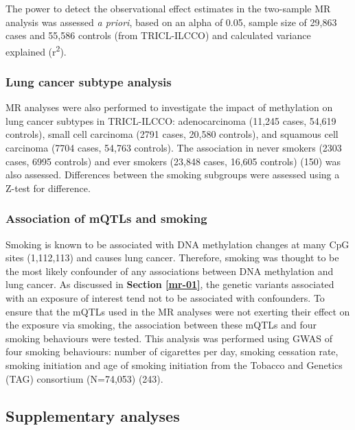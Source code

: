 \documentclass[11pt,twoside]{bristolthesis}
\begin{document}
The power to detect the observational effect estimates in the two-sample MR analysis was assessed \emph{a priori}, based on an alpha of 0.05, sample size of 29,863 cases and 55,586 controls (from TRICL-ILCCO) and calculated variance explained (r\textsuperscript{2}).

\hypertarget{lc-subtypes-methods}{%
\subsubsection{Lung cancer subtype analysis}\label{lc-subtypes-methods}}

MR analyses were also performed to investigate the impact of methylation on lung cancer subtypes in TRICL-ILCCO: adenocarcinoma (11,245 cases, 54,619 controls), small cell carcinoma (2791 cases, 20,580 controls), and squamous cell carcinoma (7704 cases, 54,763 controls). The association in never smokers (2303 cases, 6995 controls) and ever smokers (23,848 cases, 16,605 controls) (150) was also assessed. Differences between the smoking subgroups were assessed using a Z-test for difference.

\hypertarget{mqtl-smoking-mr-methods}{%
\subsubsection{Association of mQTLs and smoking}\label{mqtl-smoking-mr-methods}}

Smoking is known to be associated with DNA methylation changes at many CpG sites (1,112,113) and causes lung cancer. Therefore, smoking was thought to be the most likely confounder of any associations between DNA methylation and lung cancer. As discussed in \textbf{Section \ref{mr-01}}, the genetic variants associated with an exposure of interest tend not to be associated with confounders. To ensure that the mQTLs used in the MR analyses were not exerting their effect on the exposure via smoking, the association between these mQTLs and four smoking behaviours were tested. This analysis was performed using GWAS of four smoking behaviours: number of cigarettes per day, smoking cessation rate, smoking initiation and age of smoking initiation from the Tobacco and Genetics (TAG) consortium (N=74,053) (243).

\hypertarget{methods-supplementary-analyses-07}{%
\subsection{Supplementary analyses}\label{methods-supplementary-analyses-07}}
\end{document}
